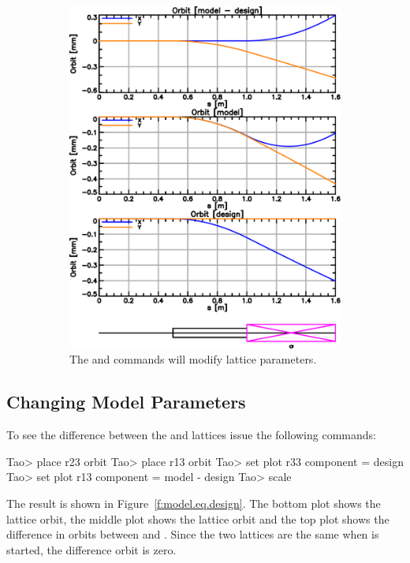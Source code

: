 \documentclass{hitec}
\begin{document}
\begin{figure}[tb]
\begin{subfigure}[b]{0.47\textwidth}
    \includegraphics[width=\textwidth]{changed-model.pdf}
    \caption{The  and  commands will modify  lattice parameters.}
    \label{f:changed.model}
  \end{subfigure}
  \caption{}
\end{figure}

\subsection{Changing Model Parameters}

To see the difference between the  and  lattices issue the following commands:
\begin{code}
Tao> place r23 orbit
Tao> place r13 orbit
Tao> set plot r33 component = design
Tao> set plot r13 component = model - design
Tao> scale
\end{code}
The result is shown in Figure~\ref{f:model.eq.design}. The bottom plot shows the  lattice
orbit, the middle plot shows the  lattice orbit and the top plot shows the difference in
orbits between  and . Since the two lattices are the same when \tao is started,
the difference orbit is zero.
\end{document}
